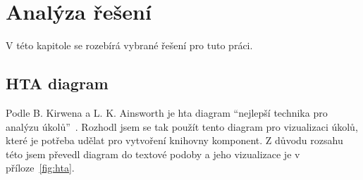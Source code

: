 \chapter{Analýza řešení}
\label{chap:analysis}

V této kapitole se rozebírá vybrané řešení pro tuto práci.

\section{HTA diagram}

Podle B. Kirwena a L. K. Ainsworth je \gls{hta} diagram ``nejlepší technika pro analýzu úkolů''~\cite{kirwan1992}.
Rozhodl jsem se tak použít tento diagram pro vizualizaci úkolů, které je potřeba udělat pro vytvoření knihovny komponent.
Z důvodu rozsahu této jsem převedl diagram do textové podoby a jeho vizualizace je v příloze~\ref{fig:hta}.

